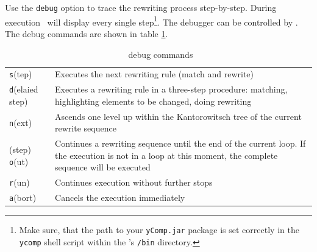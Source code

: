 Use the \texttt{debug} option to trace the rewriting process step-by-step. During execution \yComp\ will display every single step\footnote{Make sure, that the path to your \texttt{yComp.jar} package is set correctly in the \texttt{ycomp} shell script within the \GrG's \texttt{/bin} directory.}. The debugger can be controlled by \GrShell. The debug commands are shown in table \ref{tabdebug}.
\begin{table}[htbp]
  \begin{tabularx}{\linewidth}{|lX|} \hline
  \texttt{s}(tep) & Executes the next rewriting rule (match and rewrite)\\
  \texttt{d}(elaied step) & Executes a rewriting rule in a three-step procedure: matching, highlighting elements to be changed, doing rewriting \\
  \texttt{n}(ext) & Ascends one level up within the Kantorowitsch tree of the current rewrite sequence\\
  (step) \texttt{o}(ut) & Continues a rewriting sequence until the end of the current loop. If the execution is not in a loop at this moment, the complete sequence will be executed\\
  \texttt{r}(un) &  Continues execution without further stops\\
  \texttt{a}(bort) & Cancels the execution immediately\\ \hline 
  \end{tabularx}
  \caption{\GrShell\ debug commands}
  \label{tabdebug}
\end{table}
